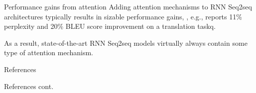 \documentclass[style=upen, size=14pt]{powerdot}
\theoremstyle{definition}
\begin{document}
\begin{slide}[toc=]{Performance gains from attention} Adding attention
  mechanisms to RNN Seq2seq architectures typically results in sizable
  performance gains, \citet[63]{luong2016neural}, e.g., reports 11\% perplexity
  and 20\% BLEU score improvement on a translation taskq.\bigskip

  As a result, state-of-the-art RNN Seq2seq models virtually always contain some
  type of attention mechanism.
\end{slide}

\begin{slide}{References}
  
  \begin{footnotesize}

    \medskip

    \medskip
    
    \medskip

    \medskip


  \end{footnotesize}
\end{slide}

\begin{slide}[toc=]{References cont.}
  \begin{footnotesize}
    
    \medskip
    
  \end{footnotesize}
\end{slide}
\end{document}
